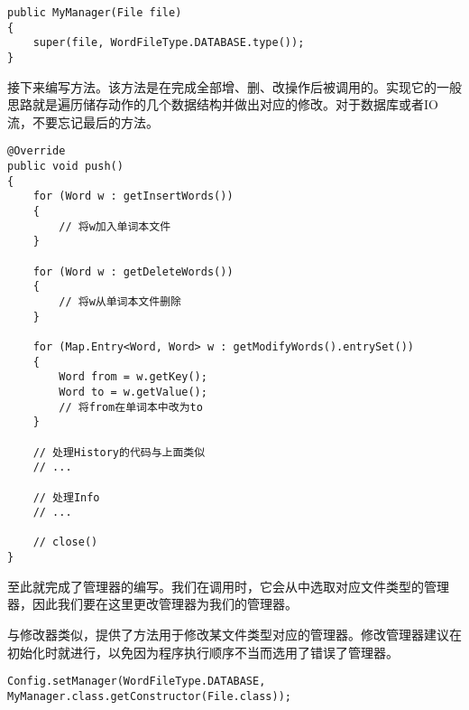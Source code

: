 \begin{lstlisting}[style=Java, caption={构造器},label={lst:Manager构造器}]
public MyManager(File file)
{
    super(file, WordFileType.DATABASE.type());
}
\end{lstlisting}

接下来编写方法。该方法是在完成全部增、删、改操作后被调用的。实现它的一般思路就是遍历储存动作的几个数据结构并做出对应的修改。对于数据库或者IO流，不要忘记最后的方法。

\begin{lstlisting}[style=Java, caption={构造器},label={lst:push方法}]
@Override
public void push()
{
    for (Word w : getInsertWords())
    {
        // 将w加入单词本文件
    }

    for (Word w : getDeleteWords())
    {
        // 将w从单词本文件删除
    }

    for (Map.Entry<Word, Word> w : getModifyWords().entrySet())
    {
        Word from = w.getKey();
        Word to = w.getValue();
        // 将from在单词本中改为to
    }

    // 处理History的代码与上面类似
    // ...

    // 处理Info
    // ...

    // close()
}
\end{lstlisting}

至此就完成了管理器的编写。我们在调用时，它会从中选取对应文件类型的管理器，因此我们要在这里更改管理器为我们的管理器。

与修改器类似，提供了方法用于修改某文件类型对应的管理器。修改管理器建议在初始化时就进行，以免因为程序执行顺序不当而选用了错误了管理器。

\begin{lstlisting}[style=Java, caption={修改管理器},label={lst:修改管理器}]
Config.setManager(WordFileType.DATABASE, MyManager.class.getConstructor(File.class));
\end{lstlisting}
